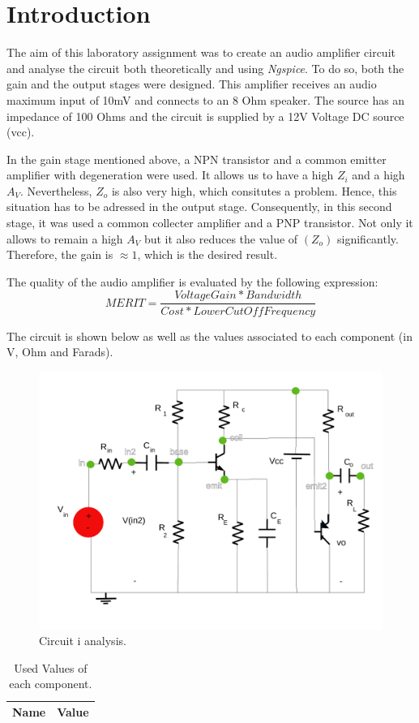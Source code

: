 \section{Introduction}
\label{introduction}


\par The aim of this laboratory assignment was to create an audio amplifier circuit and analyse the circuit both theoretically and using \textit{Ngspice}. To do so, both the gain and the output stages were designed. This amplifier receives an audio maximum input of 10mV and connects to an 8 Ohm speaker. The source has an impedance of 100 Ohms and the circuit is supplied by a 12V Voltage DC source (vcc).
\par In the gain stage mentioned above, a NPN transistor and a common emitter amplifier with degeneration were used. It allows us to have a high $Z_{i}$ and a high $A_{V}$. Nevertheless, $Z_{o}$ is also very high, which consitutes a problem. Hence, this situation has to be adressed in the output stage. Consequently, in this second stage, it was used a common collecter amplifier and a PNP transistor. Not only it allows to remain a high $A_{V}$ but it also reduces the value of $(Z_{o})$ significantly. Therefore, the gain is $\approx 1$, which is the desired result.

\par The quality of the audio amplifier is evaluated by the following expression:
\begin {equation}
	 MERIT = \frac{Voltage Gain*Bandwidth}{Cost*Lower Cut Off Frequency}   	
	\label{merit}
\end{equation}

The circuit is shown below as well as the values associated to each component (in V, Ohm and Farads).

\begin{figure}[ht] \centering
\includegraphics[width=0.8\linewidth]{lab4.pdf}
\caption{Circuit i analysis.}
\label{circuito todo}
\end{figure}
\par 


\begin{table}[ht]
  \centering
  \begin{tabular}{|l|r|}
    \hline    
    {\bf Name} & {\bf Value} \\ \hline
    
  \end{tabular}
  \caption{Used Values of each component.}
  \label{tab:3}
\end{table}


\newpage


